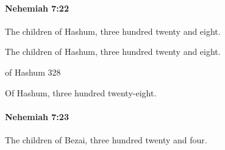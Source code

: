 		\paragraph{Nehemiah 7:22} %
			\label{NEHEMIAH-7-22}

			The children of Hashum, three hundred twenty and eight.

			\begin{versebox}
					\item[BHS] 
					\item[LXX] 
					\item[ASV] The children of Hashum, three hundred twenty and eight.
					\item[NIV] of Hashum 328
					\item[NRSV] Of Hashum, three hundred twenty-eight.
			\end{versebox}

		\paragraph{Nehemiah 7:23} %
			\label{NEHEMIAH-7-23}

			The children of Bezai, three hundred twenty and four.

